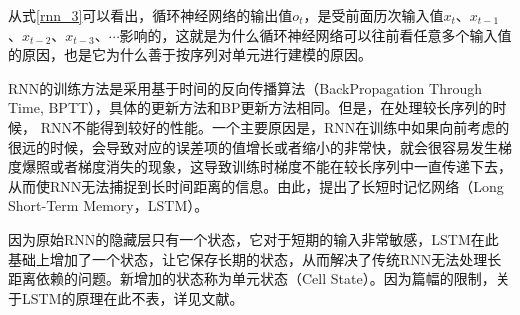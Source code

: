 从式\eqref{rnn_3}可以看出，循环神经网络的输出值$o_{t}$，是受前面历次输入值$x_{t}$、$x_{t-1}$、$x_{t-2}$、$x_{t-3}$、$\cdots$影响的，这就是为什么循环神经网络可以往前看任意多个输入值的原因，也是它为什么善于按序列对单元进行建模的原因。

RNN的训练方法是采用基于时间的反向传播算法（BackPropagation Through Time, BPTT），具体的更新方法和BP更新方法相同。但是，在处理较长序列的时候， RNN不能得到较好的性能。一个主要原因是，RNN在训练中如果向前考虑的很远的时候，会导致对应的误差项的值增长或者缩小的非常快，就会很容易发生梯度爆照或者梯度消失的现象，这导致训练时梯度不能在较长序列中一直传递下去，从而使RNN无法捕捉到长时间距离的信息。由此，提出了长短时记忆网络（Long  Short-Term Memory，LSTM）。

因为原始RNN的隐藏层只有一个状态，它对于短期的输入非常敏感，LSTM在此基础上增加了一个状态，让它保存长期的状态，从而解决了传统RNN无法处理长距离依赖的问题。新增加的状态称为单元状态（Cell State）。因为篇幅的限制，关于LSTM的原理在此不表，详见文献\citep{hochreiter1997long}。





% 

